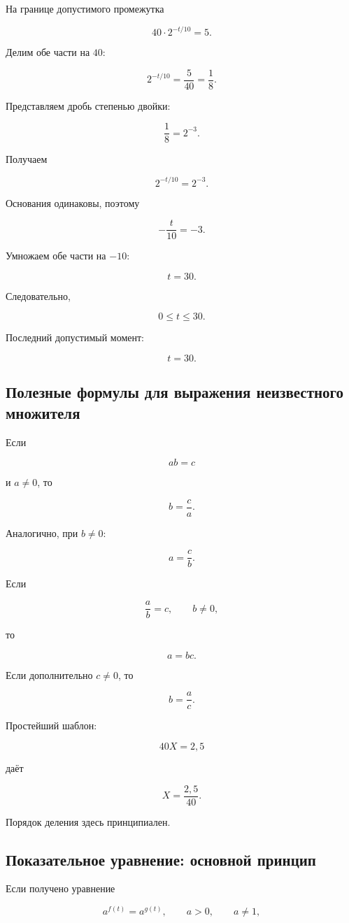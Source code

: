 \documentclass[a4paper,12pt]{article}
\newcommand{\subsect}[1]{%
  \subsection*{\color{accent}#1}%
}
\begin{document}
На границе допустимого промежутка

\[
40\cdot2^{-t/10}=5.
\]

Делим обе части на $40$:

\[
2^{-t/10}
=
\frac5{40}
=
\frac18.
\]

Представляем дробь степенью двойки:

\[
\frac18=2^{-3}.
\]

Получаем

\[
2^{-t/10}
=
2^{-3}.
\]

Основания одинаковы, поэтому

\[
-\frac{t}{10}
=
-3.
\]

Умножаем обе части на $-10$:

\[
t=30.
\]

Следовательно,

\[
0\le t\le30.
\]

Последний допустимый момент:

\[
\boxed{t=30}.
\]


\subsect{Полезные формулы для выражения неизвестного множителя}

Если

\[
ab=c
\]

и $a\ne0$, то

\[
b=\frac ca.
\]

Аналогично, при $b\ne0$:

\[
a=\frac cb.
\]

Если

\[
\frac ab=c,
\qquad
b\ne0,
\]

то

\[
a=bc.
\]

Если дополнительно $c\ne0$, то

\[
b=\frac ac.
\]

Простейший шаблон:

\[
40X=2{,}5
\]

даёт

\[
X=\frac{2{,}5}{40}.
\]

Порядок деления здесь принципиален.


\subsect{Показательное уравнение: основной принцип}

Если получено уравнение

\[
a^{f(t)}=a^{g(t)},
\qquad
a>0,
\qquad
a\ne1,
\]
\end{document}
